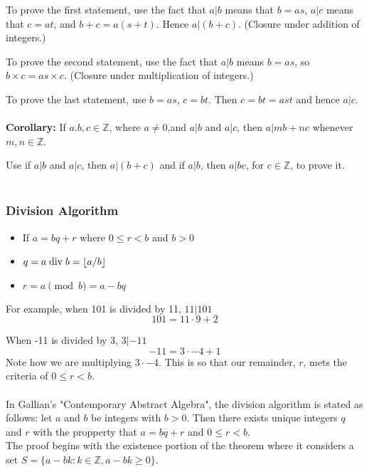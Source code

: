To prove the first statement, use the fact that $a|b$ means that $b = as$,
$a|c$ means that $c=at$,
and $b+c = a(s+t)$.
Hence $a|(b+c)$.
(Closure under addition of integers.)

To prove the second statement, use the fact that $a|b$ means $b = as$, so $b\times c = as \times c$.
(Closure under multiplication of integers.)

To prove the last statement, use $b = as$, $c = bt$. Then $c = bt = ast$ and hence $a|c$.
\\~\\

\textbf{Corollary:}
If $a. b, c \in \mathbb{Z}$, where $a \neq 0$,and $a|b$ and $a|c$, then $a|mb + nc$ whenever $m, n \in \mathbb{Z}$.

Use if $a|b$ and $a|c$, then $a|(b+c)$ and if $a|b$, then $a|bc$,
for $c \in \mathbb{Z}$, to prove it.
\\~\\


\subsubsection{Division Algorithm}

\begin{itemize}
\item If $a = bq + r$ where $0 \leq r < b$ and $b>0$
\item $q = a \bdiv b = \lfloor a/b \rfloor$
\item $r = a \pmod b = a - bq$
\end{itemize}

For example, when 101 is divided by 11, $11|101$
$$
101 = 11 \cdot 9 + 2
$$

When -11 is divided by 3, $3|-11$
$$
-11 = 3 \cdot -4 + 1
$$
Note how we are multiplying $3\cdot -4$. This is so that our remainder, $r$, mets the criteria
of $0 \leq r < b$.
\\~\\

In Gallian's "Contemporary Abstract Algebra", the division algorithm is stated as follows:
let $a$ and $b$ be integers with $b>0$.
Then there exists unique integers $q$ and $r$ with the propperty that
$a = bq +r$ and $0 \leq r < b$.
\\

The proof begins with the existence portion of the theorem where it considers a set
$S = \{ a - bk : k\in\mathbb{Z}, a - bk \geq 0 \}$.

